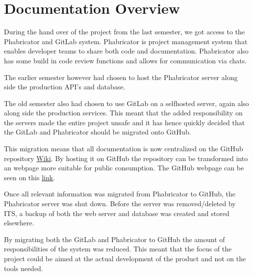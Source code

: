 \section{Documentation Overview}\label{SEC:DocumentationOverview}
During the hand over of the project from the last semester, we got access to the Phabricator and GitLab system. 
Phabricator is project management system that enables developer teams to share both code and documentation. 
Phabricator also has some build in code review functions and allows for communication via chats. 

The earlier semester however had chosen to host the Phabricator server along side the production API's and database.

The old semester also had chosen to use GitLab on a selfhosted server, again also along side the production services. 
This meant that the added responsibility on the servers made the entire project unsafe and it has hence quickly decided that the GitLab and Phabricator should be migrated onto GitHub. 

This migration means that all documentation is now centralized on the GitHub repository \href{https://github.com/aau-giraf/wiki}{Wiki}. 
By hosting it on GitHub the repository can be transformed into an webpage more suitable for public consumption.
The GitHub webpage can be seen on this \href{https://aau-giraf.github.io/wiki/}{link}.

Once all relevant information was migrated from Phabricator to GitHub, the Phabricator server was shut down. 
Before the server was removed/deleted by ITS, a backup of both the web server and database was created and stored elsewhere.

By migrating both the GitLab and Phabricator to GitHub the amount of responsibilities of the system was reduced. 
This meant that the focus of the project could be aimed at the actual development of the product and not on the tools needed.
